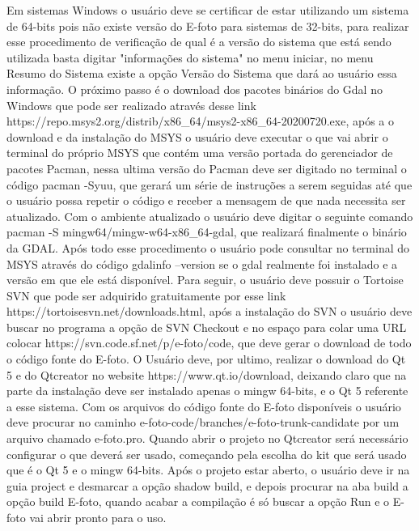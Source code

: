 Em sistemas Windows o usuário deve se certificar de estar utilizando um sistema de 64-bits pois não existe versão do E-foto para sistemas de 32-bits, para realizar esse procedimento de verificação de qual é a versão do sistema que está sendo utilizada basta digitar "informações do sistema" no menu iniciar, no menu Resumo do Sistema existe a opção Versão do Sistema que dará ao usuário essa informação. O próximo passo é o download dos pacotes binários do Gdal no Windows que pode ser realizado através desse link https://repo.msys2.org/distrib/x86\_64/msys2-x86\_64-20200720.exe, %
  após a o download e da instalação do MSYS o usuário deve executar o que vai abrir o terminal do próprio MSYS que contém uma versão portada do gerenciador de pacotes Pacman, nessa ultima versão do Pacman deve ser digitado no terminal o código pacman -Syuu, que gerará um série de instruções a serem seguidas até que o usuário possa repetir o código e receber a mensagem de que nada necessita ser atualizado. Com o ambiente atualizado o usuário deve digitar o seguinte comando pacman -S mingw64/mingw-w64-x86\_64-gdal, que realizará finalmente o binário da GDAL. Após todo esse procedimento o usuário pode consultar no terminal do MSYS através do código gdalinfo --version se o gdal realmente foi instalado e a versão em que ele está disponível. Para seguir, o usuário deve possuir o Tortoise SVN que pode ser adquirido gratuitamente por esse link https://tortoisesvn.net/downloads.html, após a instalação do SVN o usuário deve buscar no programa a opção de SVN Checkout e no espaço para colar uma URL colocar https://svn.code.sf.net/p/e-foto/code, que deve gerar o download de todo o código fonte do E-foto. O Usuário deve, por ultimo, realizar o download do Qt 5 e do Qtcreator no website https://www.qt.io/download, deixando claro que na parte da instalação deve ser instalado apenas o mingw 64-bits, e o Qt 5 referente a esse sistema. Com os arquivos do código fonte do E-foto disponíveis o usuário deve procurar no caminho e-foto-code/branches/e-foto-trunk-candidate por um arquivo chamado e-foto.pro. Quando abrir o projeto no Qtcreator será necessário configurar o que deverá ser usado, começando pela escolha do kit que será usado que é o Qt 5 e o mingw 64-bits. Após o projeto estar aberto, o usuário deve ir na guia project e desmarcar a opção shadow build, e depois procurar na aba build a opção build E-foto, quando acabar a compilação é só buscar a opção Run e o E-foto vai abrir pronto para o uso.